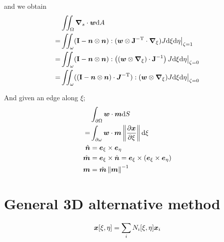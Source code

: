 \documentclass[a4paper,11pt]{article}
\renewcommand{\to}[1]{\text{\boldmath $#1$}} %
\newcommand{\ts}[1]{\text{\boldmath $\rm #1$}} %
\newcommand{\intd}[1]{{\rm d}#1}
\newcommand{\pderiv}[2]{\frac{\partial#1}{\partial#2}}
\newcommand{\norm}[1]{\left\lVert{#1}\right\rVert}
\newcommand{\T}{{\rm T}}
\begin{document}

and we obtain
\begin{align}
 &\iint_\Omega\to \nabla_s\cdot\to w\intd A\\
=&\iint_\omega(\ts I-\to n\otimes\to n):(\to w\otimes \ts J^{-\T}\cdot\to\nabla_\xi)J\intd\xi\intd\eta\big|_{\zeta=1}\\
=&\iint_\omega(\ts I-\to n\otimes\to n):\left((\to w\otimes\to\nabla_\xi) \cdot\ts J^{-1}\right)J\intd\xi\intd\eta\big|_{\zeta=0}\\
=&\iint_\omega((\ts I-\to n\otimes\to n)\cdot\to J^{-\T}):(\to w\otimes\to\nabla_\xi)J\intd\xi\intd\eta\big|_{\zeta=0}
\end{align}

And given an edge along $\xi$;
\begin{align}
 &\int_{\partial\Omega}\to w\cdot\to m\intd S\\
=&\int_{\partial\omega}\to w\cdot\to m\norm{\pderiv{\to x}{\xi}}\intd \xi\\
 \hat{\to n} &= \to e_\xi \times \to e_\eta\\
 \hat{\to m} &= \to e_\xi \times \hat{\to n} = \to e_\xi\times (\to e_\xi \times \to e_\eta)\\
 \to m &= \hat{\to m}\norm{\to m}^{-1}
\end{align}


\section{General 3D alternative method}
\begin{align}
 \to x[\xi,\eta] = \sum_i N_i[\xi,\eta]\to x_i
\end{align}
\end{document}
